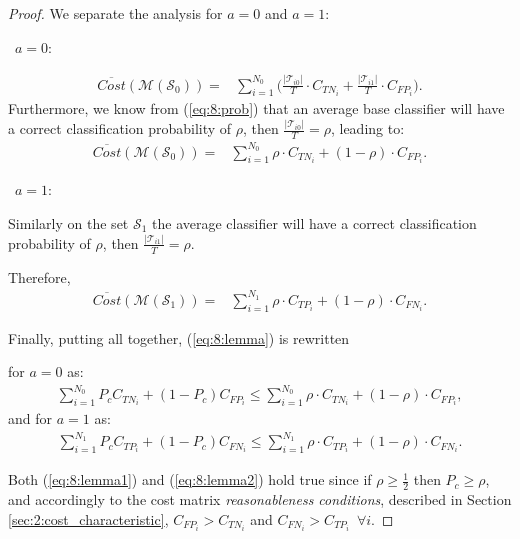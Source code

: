 {\begin{proof}
  \noindent We separate the analysis for $a=0$ and $a=1$:
  
  \textbullet\ $a=0:$
  
  \begin{align}
    \overline{Cost} (\mathcal{M}(\mathcal{S}_0)) =& \sum_{i=1}^{N_0} \bigg( 
    \frac{\vert \mathcal{T}_{i0} \vert}{T} \cdot C_{TN_i}
    + \frac{\vert \mathcal{T}_{i1} \vert}{T} \cdot C_{FP_i}\bigg).
  \end{align}
  Furthermore, we know from (\ref{eq:8:prob}) that an average base classifier will have a correct 
  classification probability of $\rho$, then $\frac{\vert \mathcal{T}_{i0} \vert}{T}=\rho$, leading 
  to:
  \begin{align}
    \overline{Cost} (\mathcal{M}(\mathcal{S}_0)) =& \sum_{i=1}^{N_0}  
    \rho \cdot C_{TN_i} + (1-\rho) \cdot C_{FP_i} .
  \end{align}

  \textbullet\ $a=1:$
 
 \noindent Similarly on the set $\mathcal{S}_1$ the average classifier will have a correct 
  classification probability of $\rho$, then $\frac{\vert \mathcal{T}_{i1} \vert}{T}=\rho$. 
  
  \noindent Therefore,
  \begin{align}
    \overline{Cost} (\mathcal{M}(\mathcal{S}_1)) =& \sum_{i=1}^{N_1}  
    \rho \cdot C_{TP_i} + (1-\rho) \cdot C_{FN_i} .
  \end{align}
 
  \noindent Finally, putting all together, (\ref{eq:8:lemma}) is rewritten
  
  \noindent for $a=0$ as:
  \begin{align}\label{eq:8:lemma1}
    \sum_{i=1}^{N_0} P_c C_{TN_i} +(1-P_c)C_{FP_i} \le 
    \sum_{i=1}^{N_0} \rho \cdot C_{TN_i} + (1-\rho) \cdot C_{FP_i},
  \end{align}
  and for $a=1$ as:
  \begin{align}\label{eq:8:lemma2}
    \sum_{i=1}^{N_1} P_c C_{TP_i} + (1-P_c)C_{FN_i} \le 
    \sum_{i=1}^{N_1}  \rho \cdot C_{TP_i} + (1-\rho) \cdot C_{FN_i}.
  \end{align}
 
  \noindent Both (\ref{eq:8:lemma1}) and (\ref{eq:8:lemma2}) hold true since if $\rho \ge 
  \frac{1}{2}$  then $P_c\ge\rho$, and accordingly to the cost matrix \textit{reasonableness 
  conditions},  described in Section \ref{sec:2:cost_characteristic}, $C_{FP_i} > C_{TN_i}$ and 
  $C_{FN_i} >   C_{TP_i}$~$\forall i$.
  \end{proof}
  
}
